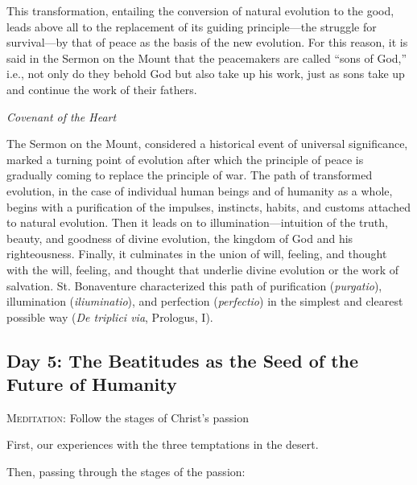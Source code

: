 \begin{quotationx}
This transformation, entailing the conversion of natural evolution to the good, leads above all to the replacement of
its guiding principle—the struggle for survival—by that of peace as the basis
of the new evolution. For this reason, it is said in the Sermon on the Mount that the peacemakers are called “sons of
God,” i.e., not only do they behold God but also take up his work, just as sons take up and continue the work of their
fathers. \begin{flushright}\textit{Covenant of the Heart}\end{flushright}

\end{quotationx}
The Sermon on the Mount, considered a historical event of universal significance, marked a turning point of evolution
after which the principle of peace is gradually coming to replace the principle of war. The path of transformed
evolution, in the case of individual human beings and of humanity as a whole, begins with a purification of the
impulses, instincts, habits, and customs attached to natural evolution. Then it leads on to
illumination—intuition of the truth, beauty, and goodness of divine evolution, the kingdom of God
and his righteousness. Finally, it culminates in the union of will, feeling, and thought with the will, feeling, and
thought that underlie divine evolution or the work of salvation. St. Bonaventure characterized this path of
purification (\emph{purgatio}), illumination (\emph{iliuminatio}), and perfection (\emph{perfectio}) in the simplest
and clearest possible way (\emph{De triplici via}, Prologus, I).

\subsection*{Day 5: The Beatitudes as the Seed of the Future of Humanity}
\textsc{Meditation}: Follow the stages of Christ's passion

First, our experiences with the three temptations in the desert.

Then, passing through the stages of the passion:

